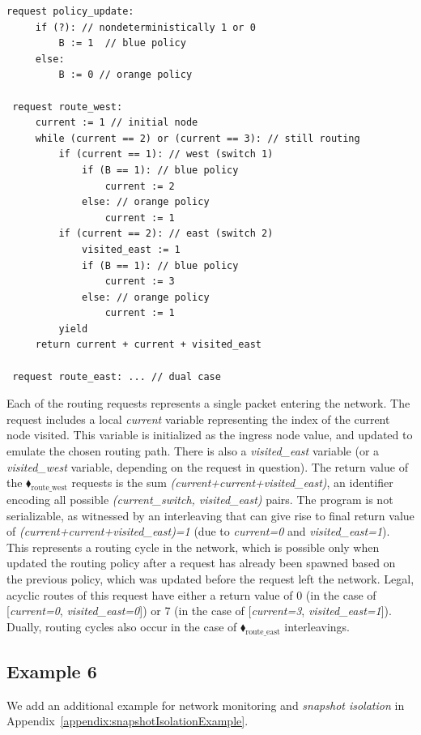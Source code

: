 \begin{center}
\begin{minipage}[!htbp]{0.85\textwidth}
	\begin{lstlisting}[caption={BGP routing (not serializable)},label={lst:BgpNonSerializable}]
 request policy_update:
     if (?): // nondeterministically 1 or 0
         B := 1  // blue policy 
     else:
         B := 0 // orange policy
		
 request route_west:
     current := 1 // initial node
     while (current == 2) or (current == 3): // still routing        
         if (current == 1): // west (switch 1)
             if (B == 1): // blue policy
                 current := 2
             else: // orange policy
                 current := 1
         if (current == 2): // east (switch 2)
             visited_east := 1
             if (B == 1): // blue policy
                 current := 3
             else: // orange policy
                 current := 1
         yield
     return current + current + visited_east
     
 request route_east: ... // dual case      
		\end{lstlisting}
\end{minipage}
\end{center}


Each of the routing requests represents a single packet entering the network. The request includes a local \textit{current} variable representing the index of the current node visited. This variable is initialized as the ingress node value, and updated to emulate the chosen routing path. There is also a \textit{visited\_east} variable (or a \textit{visited\_west} variable, depending on the request in question).
%
The return value of the {\color{ForestGreen}$\blacklozenge_\text{route\_west}$} requests is the sum \textit{(current+current+visited\_east)}, an identifier encoding all possible \textit{(current\_switch, visited\_east)} pairs.
%
The program is not serializable, as witnessed by an interleaving that can give rise to final return value of \textit{(current+current+visited\_east)=1} (due to \textit{current=0} and \textit{visited\_east=1}). This represents a routing cycle in the network, which is possible only when updated the routing policy after a request has already been spawned based on the previous policy, which was updated before the request left the network.
Legal, acyclic routes of this request have either a return value of 0 (in the case of [\textit{current=0}, \textit{visited\_east=0}]) or 7 (in the case of [\textit{current=3}, \textit{visited\_east=1}]).
Dually, routing cycles also occur in the case of {\color{ForestGreen}$\blacklozenge_\text{route\_east}$} interleavings.


\subsection{Example 6}

We add an additional example for network monitoring and \textit{snapshot isolation} in Appendix~\ref{appendix:snapshotIsolationExample}.%



